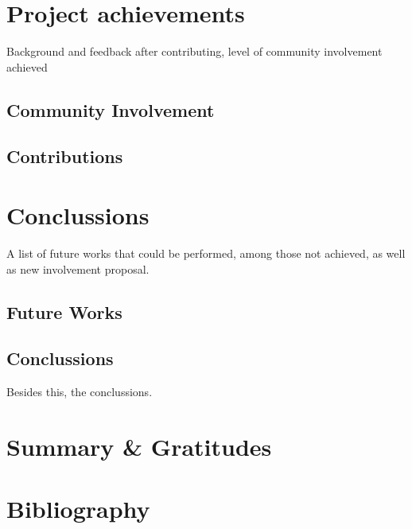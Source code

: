 \documentclass[11pt]{article}
\begin{document}
\section{Project achievements}
Background and feedback after contributing, level of community involvement achieved
\subsection{Community Involvement}
\subsection{Contributions}
\section{Conclussions}
A list of future works that could be performed, among those not achieved, as well as new involvement proposal.
\subsection{Future Works}
\subsection{Conclussions}
Besides this, the conclussions.
\section{Summary \& Gratitudes}
\section{Bibliography}
\end{document}
